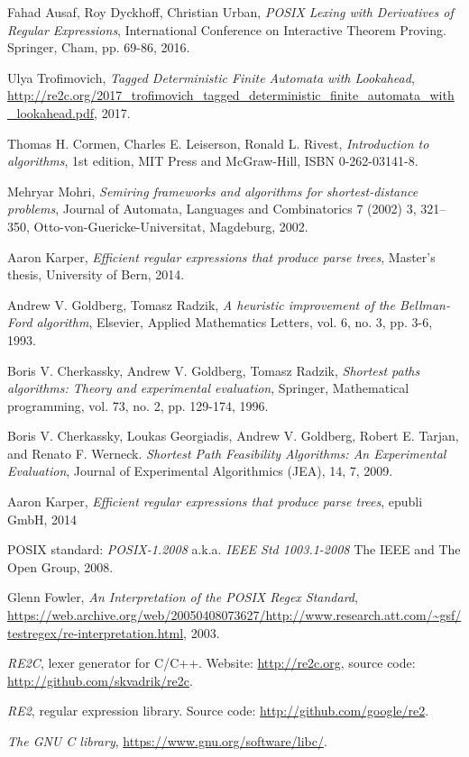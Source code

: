 \documentclass[AMA,STIX1COL]{WileyNJD-v2}
\begin{document}
\begin{thebibliography}{99}
    Fahad Ausaf, Roy Dyckhoff, Christian Urban,
    \textit{POSIX Lexing with Derivatives of Regular Expressions},
    International Conference on Interactive Theorem Proving. Springer, Cham, pp. 69-86,
    2016.

    Ulya Trofimovich,
    \textit{Tagged Deterministic Finite Automata with Lookahead},
    \url{http://re2c.org/2017_trofimovich_tagged_deterministic_finite_automata_with_lookahead.pdf},
    2017.

    Thomas H. Cormen, Charles E. Leiserson, Ronald L. Rivest,
    \textit{Introduction to algorithms},
    1st edition,
    MIT Press and McGraw-Hill,
    ISBN 0-262-03141-8.

    Mehryar Mohri,
    \textit{Semiring frameworks and algorithms for shortest-distance problems},
    Journal of Automata, Languages and Combinatorics 7 (2002) 3, 321–350, Otto-von-Guericke-Universitat, Magdeburg,
    2002.

    Aaron Karper,
    \textit{Efficient regular expressions that produce parse trees},
    Master's thesis,
    University of Bern,
    2014.

    Andrew V. Goldberg, Tomasz Radzik,
    \textit{A heuristic improvement of the Bellman-Ford algorithm},
    Elsevier, Applied Mathematics Letters, vol. 6, no. 3, pp. 3-6,
    1993.

    Boris V. Cherkassky, Andrew V. Goldberg, Tomasz Radzik,
    \textit{Shortest paths algorithms: Theory and experimental evaluation},
    Springer, Mathematical programming, vol. 73, no. 2, pp. 129-174,
    1996.

    Boris V. Cherkassky, Loukas Georgiadis, Andrew V. Goldberg, Robert E. Tarjan, and Renato F. Werneck.
    \textit{Shortest Path Feasibility Algorithms: An Experimental Evaluation},
    Journal of Experimental Algorithmics (JEA), 14, 7,
    2009.

    Aaron Karper,
    \textit{Efficient regular expressions that produce parse trees},
    epubli GmbH,
    2014

    POSIX standard: \textit{POSIX-1.2008}
    a.k.a. \textit{IEEE Std 1003.1-2008}
    The IEEE and The Open Group,
    2008.

    Glenn Fowler,
    \textit{An Interpretation of the POSIX Regex Standard},
    \url{https://web.archive.org/web/20050408073627/http://www.research.att.com/~gsf/testregex/re-interpretation.html},
    2003.

    \textit{RE2C}, lexer generator for C/C++.
    Website: \url{http://re2c.org},
    source code: \url{http://github.com/skvadrik/re2c}.

    \textit{RE2}, regular expression library.
    Source code: \url{http://github.com/google/re2}.

    \textit{The GNU C library},
    \url{https://www.gnu.org/software/libc/}.

\end{thebibliography}
\end{document}
